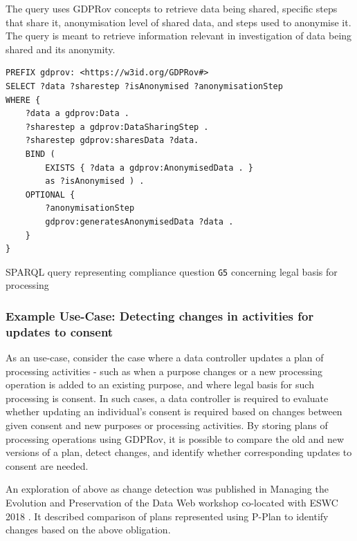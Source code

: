 The query uses GDPRov concepts to retrieve data being shared, specific steps that share it, anonymisation level of shared data, and steps used to anonymise it. The query is meant to retrieve information relevant in investigation of data being shared and its anonymity.
\begin{listing}[htbp]
\begin{verbatim}
PREFIX gdprov: <https://w3id.org/GDPRov#>
SELECT ?data ?sharestep ?isAnonymised ?anonymisationStep
WHERE {
    ?data a gdprov:Data .
    ?sharestep a gdprov:DataSharingStep .
    ?sharestep gdprov:sharesData ?data. 
    BIND (
        EXISTS { ?data a gdprov:AnonymisedData . }
        as ?isAnonymised ) .
    OPTIONAL {
        ?anonymisationStep
        gdprov:generatesAnonymisedData ?data .
    }
}
\end{verbatim}
\caption{SPARQL query representing compliance question \texttt{G5} concerning legal basis for processing}
\label{code:gdprov:sparql}
\end{listing}

\subsubsection{Example Use-Case: Detecting changes in activities for updates to consent}
As an use-case, consider the case where a data controller updates a plan of processing activities - such as when a purpose changes or a new processing operation is added to an existing purpose, and where legal basis for such processing is consent.
In such cases, a data controller is required to evaluate whether updating an individual's consent is required based on changes between given consent and new purposes or processing activities. By storing plans of processing operations using GDPRov, it is possible to compare the old and new versions of a plan, detect changes, and identify whether corresponding updates to consent are needed. 

An exploration of above as change detection was published in Managing the Evolution and Preservation of the Data Web workshop co-located with ESWC 2018 \cite{pandit_gdpr-driven_2018}. It described comparison of plans represented using P-Plan to identify changes based on the above obligation. 

